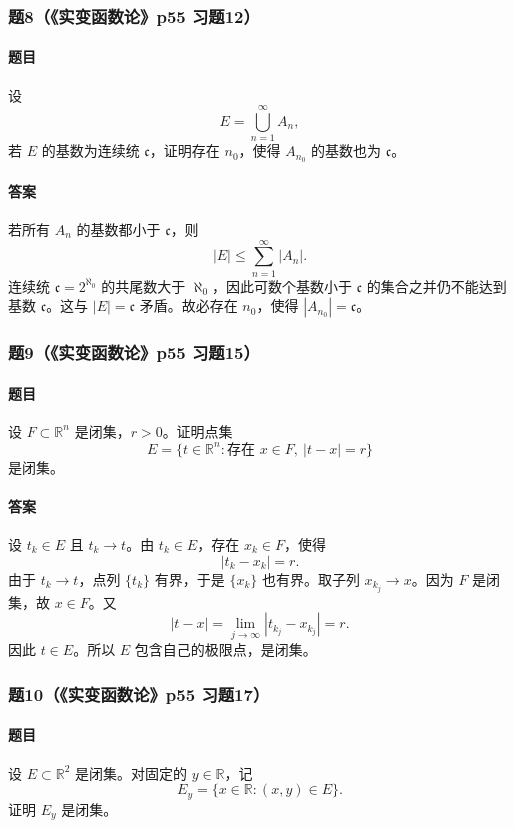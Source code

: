 \documentclass{article}
\newcommand{\R}{\mathbb{R}}
\begin{document}
	\subsubsection*{题8（《实变函数论》p55 习题12）}
	\paragraph{题目}设
	\[
	E=\bigcup_{n=1}^{\infty}A_n,
	\]
	若 $E$ 的基数为连续统 $\mathfrak c$，证明存在 $n_0$，使得 $A_{n_0}$ 的基数也为 $\mathfrak c$。
	
	\paragraph{答案}若所有 $A_n$ 的基数都小于 $\mathfrak c$，则
	\[
	|E|\le\sum_{n=1}^{\infty}|A_n|.
	\]
	连续统 $\mathfrak c=2^{\aleph_0}$ 的共尾数大于 $\aleph_0$，因此可数个基数小于 $\mathfrak c$ 的集合之并仍不能达到基数 $\mathfrak c$。这与 $|E|=\mathfrak c$ 矛盾。故必存在 $n_0$，使得 $|A_{n_0}|=\mathfrak c$。
	
	\subsubsection*{题9（《实变函数论》p55 习题15）}
	\paragraph{题目}设 $F\subset\R^n$ 是闭集，$r>0$。证明点集
	\[
	E=\{t\in\R^n:\text{存在 }x\in F,\ |t-x|=r\}
	\]
	是闭集。
	
	\paragraph{答案}设 $t_k\in E$ 且 $t_k\to t$。由 $t_k\in E$，存在 $x_k\in F$，使得
	\[
	|t_k-x_k|=r.
	\]
	由于 $t_k\to t$，点列 $\{t_k\}$ 有界，于是 $\{x_k\}$ 也有界。取子列 $x_{k_j}\to x$。因为 $F$ 是闭集，故 $x\in F$。又
	\[
	|t-x|=\lim_{j\to\infty}|t_{k_j}-x_{k_j}|=r.
	\]
	因此 $t\in E$。所以 $E$ 包含自己的极限点，是闭集。
	
	\subsubsection*{题10（《实变函数论》p55 习题17）}
	\paragraph{题目}设 $E\subset\R^2$ 是闭集。对固定的 $y\in\R$，记
	\[
	E_y=\{x\in\R:(x,y)\in E\}.
	\]
	证明 $E_y$ 是闭集。
	
\end{document}
